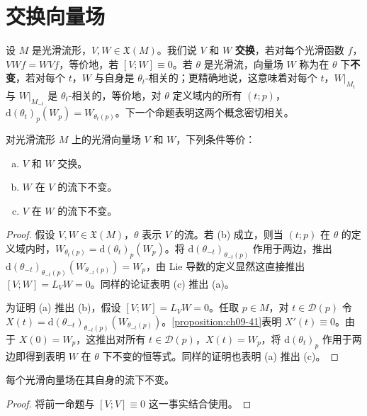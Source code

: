\documentclass[../../main.tex]{subfiles}
\begin{document}
\section{交换向量场}\label{section:ch09-交换向量场}

设 $M$ 是光滑流形，$V,W\in\mathfrak{X}(M)$。我们说 $V$ 和 $W$ \textbf{交换}，若对每个光滑函数 $f$，$VWf=WVf$，等价地，若 $[V;W]\equiv 0$。若 $\theta$ 是光滑流，向量场 $W$ 称为在 $\theta$ 下\textbf{不变}，若对每个 $t$，$W$ 与自身是 $\theta_t$-相关的；更精确地说，这意味着对每个 $t$，$W|_{M_t}$ 与 $W|_{M_{-t}}$ 是 $\theta_t$-相关的，等价地，对 $\theta$ 定义域内的所有 $(t;p)$，$\mathrm{d}(\theta_t)_p(W_p)=W_{\theta_t(p)}$。下一个命题表明这两个概念密切相关。

\begin{theorem}\label{theorem:ch09-42}
对光滑流形 $M$ 上的光滑向量场 $V$ 和 $W$，下列条件等价：
\begin{enumerate}[(a)]
\item $V$ 和 $W$ 交换。
\item $W$ 在 $V$ 的流下不变。
\item $V$ 在 $W$ 的流下不变。
\end{enumerate}
\end{theorem}

\begin{proof}
假设 $V,W\in\mathfrak{X}(M)$，$\theta$ 表示 $V$ 的流。若 (b) 成立，则当 $(t;p)$ 在 $\theta$ 的定义域内时，$W_{\theta_t(p)}=\mathrm{d}(\theta_t)_p(W_p)$。将 $\mathrm{d}(\theta_{-t})_{\theta_{-t}(p)}$ 作用于两边，推出 $\mathrm{d}(\theta_{-t})_{\theta_{-t}(p)}(W_{\theta_{-t}(p)})=W_p$，由 Lie 导数的定义显然这直接推出 $[V;W]=L_VW=0$。同样的论证表明 (c) 推出 (a)。

为证明 (a) 推出 (b)，假设 $[V;W]=L_VW=0$。任取 $p\in M$，对 $t\in\mathscr{D}(p)$ 令 $X(t)=\mathrm{d}(\theta_{-t})_{\theta_{-t}(p)}(W_{\theta_{-t}(p)})$。\cref{proposition:ch09-41}表明 $X'(t)\equiv 0$。由于 $X(0)=W_p$，这推出对所有 $t\in\mathscr{D}(p)$，$X(t)=W_p$，将 $\mathrm{d}(\theta_t)_p$ 作用于两边即得到表明 $W$ 在 $\theta$ 下不变的恒等式。同样的证明也表明 (a) 推出 (c)。
\end{proof}

\begin{corollary}\label{corollary:ch09-43}
每个光滑向量场在其自身的流下不变。
\end{corollary}

\begin{proof}
将前一命题与 $[V;V]\equiv 0$ 这一事实结合使用。
\end{proof}
\end{document}
